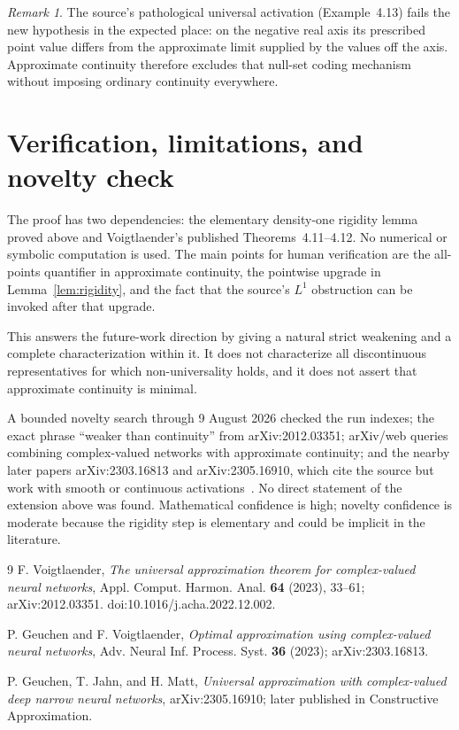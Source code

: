 \documentclass[11pt]{article}
\theoremstyle{remark}
\newtheorem{remark}[theorem]{Remark}
\begin{document}
\begin{remark}
The source's pathological universal activation (Example~4.13) fails the new
hypothesis in the expected place: on the negative real axis its prescribed
point value differs from the approximate limit supplied by the values off the
axis.  Approximate continuity therefore excludes that null-set coding
mechanism without imposing ordinary continuity everywhere.
\end{remark}

\section{Verification, limitations, and novelty check}

The proof has two dependencies: the elementary density-one rigidity lemma
proved above and Voigtlaender's published Theorems~4.11--4.12.  No numerical
or symbolic computation is used.  The main points for human verification are
the all-points quantifier in approximate continuity, the pointwise upgrade in
Lemma~\ref{lem:rigidity}, and the fact that the source's $L^1$ obstruction can
be invoked after that upgrade.

This answers the future-work direction by giving a natural strict weakening
and a complete characterization within it.  It does not characterize all
discontinuous representatives for which non-universality holds, and it does
not assert that approximate continuity is minimal.

A bounded novelty search through 9 August 2026 checked the run indexes; the
exact phrase ``weaker than continuity'' from arXiv:2012.03351; arXiv/web
queries combining complex-valued networks with approximate continuity; and
the nearby later papers arXiv:2303.16813 and arXiv:2305.16910, which cite the
source but work with smooth or continuous activations~\cite{optimal,narrow}.
No direct statement of the extension above was found.  Mathematical
confidence is high; novelty confidence is moderate because the rigidity step
is elementary and could be implicit in the literature.

\begin{thebibliography}{9}
F. Voigtlaender,
\emph{The universal approximation theorem for complex-valued neural networks},
Appl. Comput. Harmon. Anal. \textbf{64} (2023), 33--61;
arXiv:2012.03351. doi:10.1016/j.acha.2022.12.002.

P. Geuchen and F. Voigtlaender,
\emph{Optimal approximation using complex-valued neural networks},
Adv. Neural Inf. Process. Syst. \textbf{36} (2023);
arXiv:2303.16813.

P. Geuchen, T. Jahn, and H. Matt,
\emph{Universal approximation with complex-valued deep narrow neural networks},
arXiv:2305.16910; later published in Constructive Approximation.
\end{thebibliography}
\end{document}
